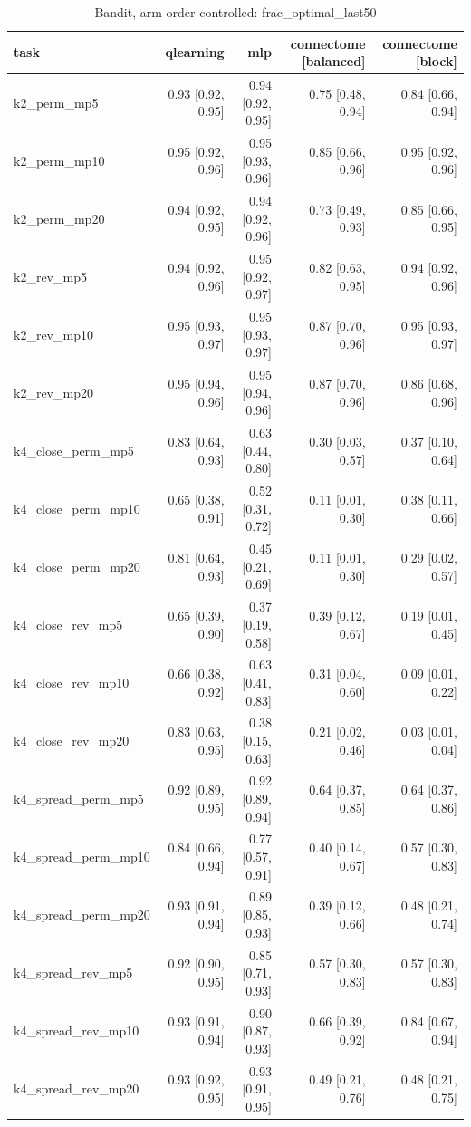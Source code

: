 \begin{table}[t]
\centering
\small
\begin{tabular}{lrrrr}
\toprule
task & qlearning & mlp & connectome [balanced] & connectome [block] \\
\midrule
k2\_perm\_mp5 & 0.93 [0.92, 0.95] & 0.94 [0.92, 0.95] & 0.75 [0.48, 0.94] & 0.84 [0.66, 0.94] \\
k2\_perm\_mp10 & 0.95 [0.92, 0.96] & 0.95 [0.93, 0.96] & 0.85 [0.66, 0.96] & 0.95 [0.92, 0.96] \\
k2\_perm\_mp20 & 0.94 [0.92, 0.95] & 0.94 [0.92, 0.96] & 0.73 [0.49, 0.93] & 0.85 [0.66, 0.95] \\
k2\_rev\_mp5 & 0.94 [0.92, 0.96] & 0.95 [0.92, 0.97] & 0.82 [0.63, 0.95] & 0.94 [0.92, 0.96] \\
k2\_rev\_mp10 & 0.95 [0.93, 0.97] & 0.95 [0.93, 0.97] & 0.87 [0.70, 0.96] & 0.95 [0.93, 0.97] \\
k2\_rev\_mp20 & 0.95 [0.94, 0.96] & 0.95 [0.94, 0.96] & 0.87 [0.70, 0.96] & 0.86 [0.68, 0.96] \\
k4\_close\_perm\_mp5 & 0.83 [0.64, 0.93] & 0.63 [0.44, 0.80] & 0.30 [0.03, 0.57] & 0.37 [0.10, 0.64] \\
k4\_close\_perm\_mp10 & 0.65 [0.38, 0.91] & 0.52 [0.31, 0.72] & 0.11 [0.01, 0.30] & 0.38 [0.11, 0.66] \\
k4\_close\_perm\_mp20 & 0.81 [0.64, 0.93] & 0.45 [0.21, 0.69] & 0.11 [0.01, 0.30] & 0.29 [0.02, 0.57] \\
k4\_close\_rev\_mp5 & 0.65 [0.39, 0.90] & 0.37 [0.19, 0.58] & 0.39 [0.12, 0.67] & 0.19 [0.01, 0.45] \\
k4\_close\_rev\_mp10 & 0.66 [0.38, 0.92] & 0.63 [0.41, 0.83] & 0.31 [0.04, 0.60] & 0.09 [0.01, 0.22] \\
k4\_close\_rev\_mp20 & 0.83 [0.63, 0.95] & 0.38 [0.15, 0.63] & 0.21 [0.02, 0.46] & 0.03 [0.01, 0.04] \\
k4\_spread\_perm\_mp5 & 0.92 [0.89, 0.95] & 0.92 [0.89, 0.94] & 0.64 [0.37, 0.85] & 0.64 [0.37, 0.86] \\
k4\_spread\_perm\_mp10 & 0.84 [0.66, 0.94] & 0.77 [0.57, 0.91] & 0.40 [0.14, 0.67] & 0.57 [0.30, 0.83] \\
k4\_spread\_perm\_mp20 & 0.93 [0.91, 0.94] & 0.89 [0.85, 0.93] & 0.39 [0.12, 0.66] & 0.48 [0.21, 0.74] \\
k4\_spread\_rev\_mp5 & 0.92 [0.90, 0.95] & 0.85 [0.71, 0.93] & 0.57 [0.30, 0.83] & 0.57 [0.30, 0.83] \\
k4\_spread\_rev\_mp10 & 0.93 [0.91, 0.94] & 0.90 [0.87, 0.93] & 0.66 [0.39, 0.92] & 0.84 [0.67, 0.94] \\
k4\_spread\_rev\_mp20 & 0.93 [0.92, 0.95] & 0.93 [0.91, 0.95] & 0.49 [0.21, 0.76] & 0.48 [0.21, 0.75] \\
\bottomrule
\end{tabular}
\caption{Bandit, arm order controlled: frac\_optimal\_last50}
\label{tab:bandit_perm_frac_optimal_last50}
\end{table}